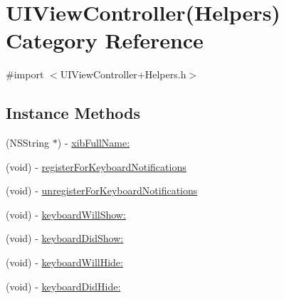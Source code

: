 \hypertarget{category_u_i_view_controller_07_helpers_08}{\section{U\-I\-View\-Controller(Helpers) Category Reference}
\label{category_u_i_view_controller_07_helpers_08}
}


{\ttfamily \#import $<$U\-I\-View\-Controller+\-Helpers.\-h$>$}

\subsection*{Instance Methods}
\begin{DoxyCompactItemize}
\item 
(N\-S\-String $\ast$) -\/ \hyperlink{category_u_i_view_controller_07_helpers_08_a43e4e6cebd75e5cefc32bdd145977127}{xib\-Full\-Name\-:}
\item 
(void) -\/ \hyperlink{category_u_i_view_controller_07_helpers_08_a4173ab4a8c811b6675c8e8cc16e60214}{register\-For\-Keyboard\-Notifications}
\item 
(void) -\/ \hyperlink{category_u_i_view_controller_07_helpers_08_abea16cb108e751f1dcef5272c8ee06ba}{unregister\-For\-Keyboard\-Notifications}
\item 
(void) -\/ \hyperlink{category_u_i_view_controller_07_helpers_08_ab0307c74a93f480bd9bd43cbf43dcaa8}{keyboard\-Will\-Show\-:}
\item 
(void) -\/ \hyperlink{category_u_i_view_controller_07_helpers_08_a2b3134402e311793785ae0545547e75e}{keyboard\-Did\-Show\-:}
\item 
(void) -\/ \hyperlink{category_u_i_view_controller_07_helpers_08_a8fc966b4271a96a5937990ead685597a}{keyboard\-Will\-Hide\-:}
\item 
(void) -\/ \hyperlink{category_u_i_view_controller_07_helpers_08_acd91aa8df79b56f065cc12f8a3946ad2}{keyboard\-Did\-Hide\-:}
\end{DoxyCompactItemize}


